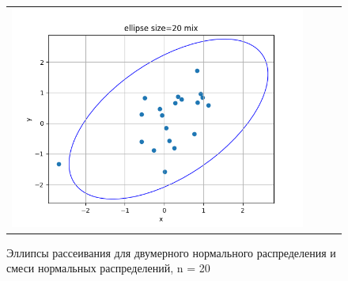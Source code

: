 \begin{figure}[H]
\begin{tabular}{cccc}
		\includegraphics[scale=0.3]{ellipse_20_mix.png}
	\end{tabular}
	\caption{Эллипсы рассеивания для двумерного нормального распределения и смеси нормальных распределений, n = 20}
\end{figure}


